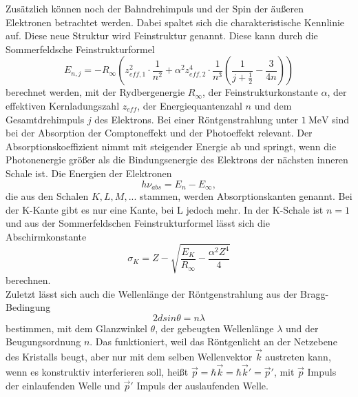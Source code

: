 \documentclass[a4paper]{scrartcl}
\begin{document}
Zusätzlich können noch der Bahndrehimpuls und der Spin der äußeren Elektronen betrachtet werden. Dabei spaltet sich die charakteristische Kennlinie auf. Diese neue Struktur wird Feinstruktur genannt. Diese kann durch die Sommerfeldsche Feinstrukturformel 
\begin{equation}
  E_{n,j}=-R_{\infty}\left(z^2_{eff,1}\cdot \frac{1}{n^2}+\alpha^2 z^4_{eff,2}\cdot\frac{1}{n^3}\left(\frac{1}{j+\frac{1}{2}}-\frac{3}{4n}\right)\right)
  \label{4}
\end{equation}
berechnet werden, mit der Rydbergenergie $R_{\infty}$, der Feinstrukturkonstante $\alpha$, der effektiven Kernladungszahl $z_{eff}$, der Energiequantenzahl $n$ und dem Gesamtdrehimpuls $j$ des Elektrons.
Bei einer Röntgenstrahlung unter $1\ \si{\MeV}$ sind bei der Absorption der Comptoneffekt und der Photoeffekt relevant. Der Absorptionskoeffizient nimmt mit steigender Energie ab und springt, wenn die Photonenergie größer als die Bindungsenergie des Elektrons der nächsten inneren Schale ist. Die Energien der Elektronen 
\begin{equation}
  h\nu_{abs}=E_{n}-E_{\infty},
  \label{5}
\end{equation}
die aus den Schalen $K,L,M,...$ stammen, werden Absorptionskanten genannt. Bei der K-Kante gibt es nur eine Kante, bei L jedoch mehr. In der K-Schale ist $n=1$ und aus der Sommerfeldschen Feinstrukturformel lässt sich die Abschirmkonstante 
\begin{equation}
  \sigma_{K}=Z-\sqrt{\frac{E_{K}}{R_{\infty}}-\frac{\alpha^2 Z^4}{4}}
  \label{6}
\end{equation}
berechnen.\\
Zuletzt lässt sich auch die Wellenlänge der Röntgenstrahlung aus der Bragg-Bedingung
\begin{equation}
  2dsin\theta=n\lambda
  \label{7}
\end{equation}
bestimmen, mit dem Glanzwinkel $\theta$, der gebeugten Wellenlänge $\lambda$ und der Beugungsordnung $n$. Das funktioniert, weil das Röntgenlicht an der Netzebene des Kristalls beugt, aber nur mit dem selben Wellenvektor $\vec k$ austreten kann, wenn es konstruktiv interferieren soll, heißt $\vec p=\hbar\vec k=\hbar\vec k'=\vec p'$, mit $\vec p$ Impuls der einlaufenden Welle und $\vec p'$ Impuls der auslaufenden Welle. 
\end{document}
